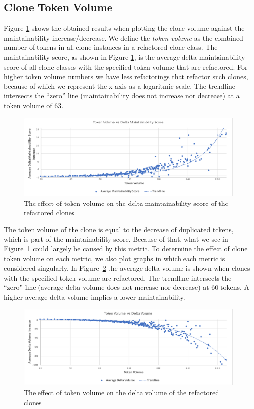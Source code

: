 \subsection{Clone Token Volume}
Figure \ref{fig:maintainabilityscore} shows the obtained results when plotting the clone volume against the maintainability increase/decrease. We define the \textit{token volume} as the combined number of tokens in all clone instances in a refactored clone class. The maintainability score, as shown in Figure \ref{fig:maintainabilityscore}, is the average delta maintainability score of all clone classes with the specified token volume that are refactored. For higher token volume numbers we have less refactorings that refactor such clones, because of which we represent the x-axis as a logaritmic scale. The trendline intersects the ``zero'' line (maintainability does not increase nor decrease) at a token volume of 63.

\begin{figure}[H]
  \includegraphics[width=1\textwidth]{img/maintainabilityscore}
  \caption{The effect of token volume on the delta maintainability score of the refactored clones}
  \label{fig:maintainabilityscore}
\end{figure}

The token volume of the clone is equal to the decrease of duplicated tokens, which is part of the maintainability score. Because of that, what we see in Figure~\ref{fig:maintainabilityscore} could largely be caused by this metric. To determine the effect of clone token volume on each metric, we also plot graphs in which each metric is considered singularly. In Figure~\ref{fig:volume} the average delta volume is shown when clones with the specified token volume are refactored. The trendline intersects the ``zero'' line (average delta volume does not increase nor decrease) at 60 tokens. A higher average delta volume implies a lower maintainability.

\begin{figure}[H]
  \includegraphics[width=1\textwidth]{img/volume}
  \caption{The effect of token volume on the delta volume of the refactored clones}
  \label{fig:volume}
\end{figure}

